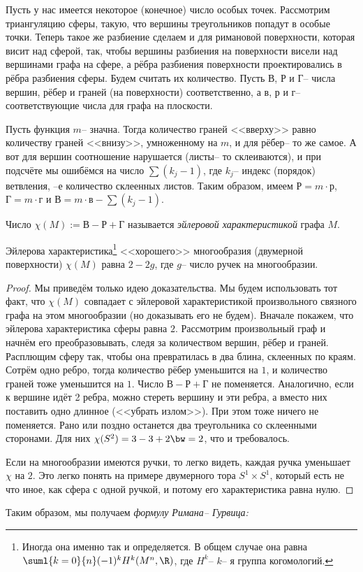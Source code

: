 \documentclass[a4paper]{article}
\begin{document}
Пусть у нас имеется некоторое (конечное) число особых точек. Рассмотрим
триангуляцию сферы, такую, что вершины треугольников
попадут в особые точки. Теперь такое же разбиение сделаем и для римановой поверхности, которая
висит над сферой, так, чтобы вершины разбиения на поверхности висели над вершинами графа на сфере,
а рёбра разбиения поверхности проектировались в рёбра разбиения сферы. Будем считать их количество.
Пусть $В$, $Р$ и $Г$-- числа вершин, рёбер и граней (на поверхности) соответственно, а $в$, $р$ и $г$--
соответствующие числа для графа на плоскости.

Пусть функция $m$-- значна. Тогда количество граней <<вверху>> равно количеству граней <<внизу>>, умноженному на $m$,
и для рёбер-- то же самое. А вот для вершин соотношение нарушается (листы-- то склеиваются),
и при подсчёте мы ошибёмся на число $\sum (k_j - 1)$, где $k_j$-- индекс (порядок) ветвления, --е
количество склеенных листов. Таким образом, имеем $Р=m\cdot р$, $Г = m \cdot г$ и $В = m\cdot в - \sum (k_j-1)$.

\begin{df}
Число $\chi(M) :=В-Р+Г$ называется \emph{эйлеровой характеристикой} графа $M$.
\end{df}

\begin{stm}
Эйлерова характеристика\footnote{Иногда она именно так и определяется. В общем случае она равна $\suml{k=0}{n} (-1)^k H^k(M^n,\R)$,
где $H^k$-- $k$-- я группа когомологий.} <<хорошего>> многообразия (двумерной поверхности)
$\chi(M)$ равна $2-2g$, где $g$-- число ручек на многообразии.
\end{stm}
\begin{proof}
Мы приведём только идею доказательства. Мы будем использовать тот факт, что $\chi(M)$ совпадает с эйлеровой
характеристикой произвольного связного графа на этом многообразии (но доказывать его не будем).
Вначале покажем, что эйлерова характеристика сферы равна $2$. Рассмотрим произвольный граф и начнём его преобразовывать,
следя за количеством вершин, рёбер и граней. Расплющим сферу так, чтобы она превратилась в два блина, склеенных по краям.
Сотрём одно ребро, тогда количество рёбер уменьшится на $1$, и количество граней тоже уменьшится на $1$. Число $В - Р+Г$
не поменяется. Аналогично, если к вершине идёт 2 ребра, можно стереть вершину и эти ребра, а вместо них поставить
одно длинное (<<убрать излом>>). При этом тоже ничего не поменяется. Рано или поздно останется два треугольника со склеенными
сторонами. Для них $\chi(S^2) = 3 - 3 + 2\bw=2$, что и требовалось.

Если на многообразии имеются ручки, то легко видеть, каждая ручка уменьшает $\chi$ на $2$. Это легко понять на примере
двумерного тора $S^1 \times S^1$, который есть не что иное, как сфера с одной ручкой, и потому его характеристика равна нулю.
\end{proof}

Таким образом, мы получаем \emph{формулу Римана-- Гурвица:}
\end{document}
